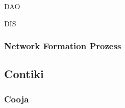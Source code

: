 DAO

DIS

\subsubsection{Network Formation Prozess}
\label{subsubsec:grundlagen_rpl_networkformation}


\subsection{Contiki}
\label{subsec:grundlagen_contiki}

\subsubsection{Cooja}
\label{subsubsec:grundlagen_cooja}
